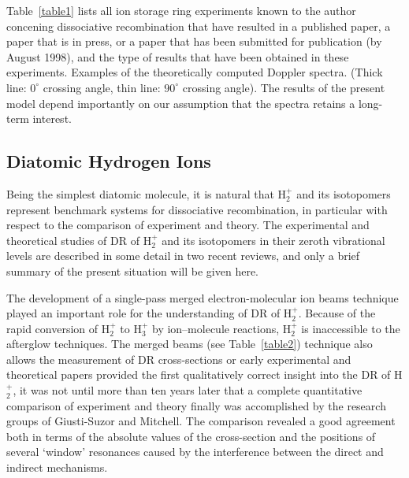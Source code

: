 \documentclass{ws-rv9x6}
\begin{document}
Table~\ref{table1} lists all ion storage ring experiments known to the author
concening dissociative recombination that have resulted in a published
paper, a paper that is in press, or a paper that has been submitted
for publication (by August 1998), and the type of results that have
been obtained in these experiments. Examples of the theoretically
computed Doppler spectra.  (Thick line: $0^\circ$ crossing angle, thin
line: $90^\circ$ crossing angle). The results of the 
present model depend importantly on our assumption 
that the spectra retains a long-term interest.

\subsection{Diatomic Hydrogen Ions}

Being the simplest diatomic molecule, it is natural that H$_2^+$ and
its isotopomers represent benchmark systems for dissociative
recombination, in particular with respect to the comparison of
experiment and theory. The experimental and theoretical studies of DR
of H$_2^+$ and its isotopomers in their zeroth vibrational levels are
described in some detail in two recent reviews,\cite{2,32} and only a
brief summary of the present situation will be given here.

The development of a single-pass merged electron-molecular ion beams
technique\cite{65} played an important role for the understanding of
DR of H$_2^+$. Because of the rapid conversion of H$_2^+$ to H$_3^+$
by ion--molecule reactions, H$_2^+$ is inaccessible to the afterglow
techniques. The merged beams (see Table~\ref{table2}) 
technique
also allows the measurement of DR cross-sections or 
early experimental and theoretical papers\cite{6,7} provided the
first qualitatively correct insight into the DR of H$_2^+$, it was not
until more than ten years later that a complete quantitative
comparison of experiment and theory finally was accomplished by the
research groups of Giusti-Suzor and Mitchell.\cite{66}\cdash\cite{69}
The comparison revealed a good agreement both in terms of the absolute
values of the cross-section and the positions of several `window'
resonances caused by the interference between the direct and indirect
mechanisms.
\end{document}
